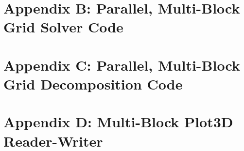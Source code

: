 \documentclass[twocolumn,10pt]{asme2ej}
\begin{document}
\clearpage

\section*{Appendix B: Parallel, Multi-Block Grid Solver Code}


\section*{Appendix C: Parallel, Multi-Block Grid Decomposition Code}


\clearpage

\section*{Appendix D: Multi-Block Plot3D Reader-Writer}








%

%

%

\end{document}
